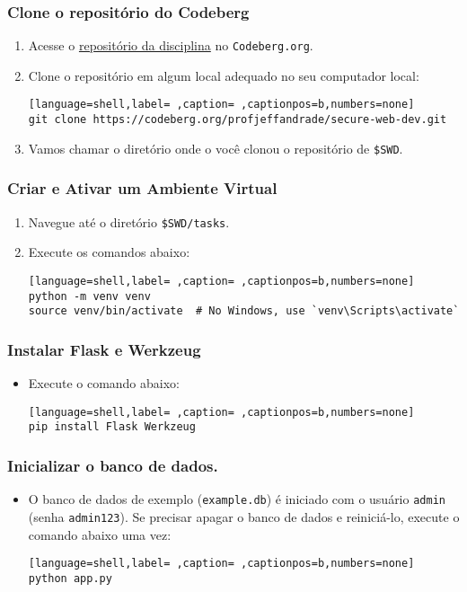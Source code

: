 \documentclass{scrartcl}
\begin{document}
\subsubsection{Clone o repositório do Codeberg}
\label{sec:org120b940}
\begin{enumerate}
\item Acesse o \href{https://codeberg.org/profjeffandrade/secure-web-dev}{repositório da disciplina} no \texttt{Codeberg.org}.
\item Clone o repositório em algum local adequado no seu computador local:
\begin{lstlisting}[language=shell,label= ,caption= ,captionpos=b,numbers=none]
git clone https://codeberg.org/profjeffandrade/secure-web-dev.git
\end{lstlisting}
\item Vamos chamar o diretório onde o você clonou o repositório de \texttt{\$SWD}.
\end{enumerate}

\subsubsection{Criar e Ativar um Ambiente Virtual}
\label{sec:orga5263e8}
\begin{enumerate}
\item Navegue até o diretório \texttt{\$SWD/tasks}.
\item Execute os comandos abaixo:
\begin{lstlisting}[language=shell,label= ,caption= ,captionpos=b,numbers=none]
python -m venv venv
source venv/bin/activate  # No Windows, use `venv\Scripts\activate`
\end{lstlisting}
\end{enumerate}

\subsubsection{Instalar Flask e Werkzeug}
\label{sec:org7305874}
\begin{itemize}
\item Execute o comando abaixo:
\begin{lstlisting}[language=shell,label= ,caption= ,captionpos=b,numbers=none]
pip install Flask Werkzeug
\end{lstlisting}
\end{itemize}

\subsubsection{Inicializar o banco de dados.}
\label{sec:orgac167dc}
\begin{itemize}
\item O banco de dados de exemplo (\texttt{example.db}) é iniciado com o usuário \texttt{admin}
(senha \texttt{admin123}). Se precisar apagar o banco de dados e reiniciá-lo, execute
o comando abaixo uma vez:
\begin{lstlisting}[language=shell,label= ,caption= ,captionpos=b,numbers=none]
python app.py
\end{lstlisting}
\end{itemize}
\end{document}
